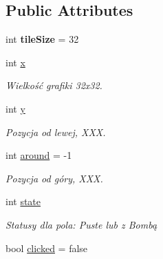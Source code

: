 \subsection*{Public Attributes}
\begin{DoxyCompactItemize}
\item 
\mbox{\label{class_saper_1_1_tile_af14b4a73e2ea580fe25cf29eba901f83}} 
int {\bfseries tile\+Size} = 32
\item 
\mbox{\label{class_saper_1_1_tile_a8861f08f0232b9e06b35f9539f97614e}} 
int \mbox{\hyperlink{class_saper_1_1_tile_a8861f08f0232b9e06b35f9539f97614e}{x}}
\begin{DoxyCompactList}\small\item\em Wielkość grafiki 32x32. \end{DoxyCompactList}\item 
\mbox{\label{class_saper_1_1_tile_a4bee1eb877052349f14938b9d28eea87}} 
int \mbox{\hyperlink{class_saper_1_1_tile_a4bee1eb877052349f14938b9d28eea87}{y}}
\begin{DoxyCompactList}\small\item\em Pozycja od lewej, X\+XX. \end{DoxyCompactList}\item 
\mbox{\label{class_saper_1_1_tile_a049847b44328392d75c1e04276417191}} 
int \mbox{\hyperlink{class_saper_1_1_tile_a049847b44328392d75c1e04276417191}{around}} = -\/1
\begin{DoxyCompactList}\small\item\em Pozycja od góry, X\+XX. \end{DoxyCompactList}\item 
\mbox{\label{class_saper_1_1_tile_a59c61b4cd8fc0665533989c017b23688}} 
int \mbox{\hyperlink{class_saper_1_1_tile_a59c61b4cd8fc0665533989c017b23688}{state}}
\begin{DoxyCompactList}\small\item\em Statusy dla pola\+: Puste lub z Bombą \end{DoxyCompactList}\item 
\mbox{\label{class_saper_1_1_tile_a0b3e70fcbb158d0d48856f4f1c21e74c}} 
bool \mbox{\hyperlink{class_saper_1_1_tile_a0b3e70fcbb158d0d48856f4f1c21e74c}{clicked}} = false

\end{DoxyCompactItemize}
